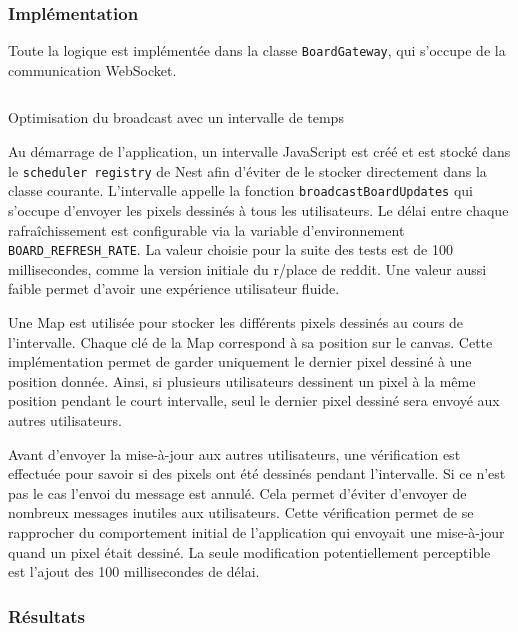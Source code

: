 \subsubsection{Implémentation}

Toute la logique est implémentée dans la classe \texttt{BoardGateway}, qui s'occupe de la communication WebSocket.

\begin{listing}[H]
  \inputminted[highlightlines={3,12,18,19,29},linenos]{ts}{assets/figures/opti-interval.ts}
  \caption{Optimisation du broadcast avec un intervalle de temps}
  \label{listing:opti-interval}
\end{listing}

Au démarrage de l'application, un intervalle JavaScript est créé et est stocké dans le \texttt{scheduler registry} de Nest afin d'éviter de le stocker directement dans la classe courante. L'intervalle appelle la fonction \texttt{broadcastBoardUpdates} qui s'occupe d'envoyer les pixels dessinés à tous les utilisateurs. Le délai entre chaque rafraîchissement est configurable via la variable d'environnement \texttt{BOARD_REFRESH_RATE}. La valeur choisie pour la suite des tests est de 100 millisecondes, comme la version initiale du r/place de \gls{reddit}. Une valeur aussi faible permet d'avoir une expérience utilisateur fluide.

Une Map est utilisée pour stocker les différents pixels dessinés au cours de l'intervalle. Chaque clé de la Map correspond à sa position sur le canvas. Cette implémentation permet de garder uniquement le dernier pixel dessiné à une position donnée. Ainsi, si plusieurs utilisateurs dessinent un pixel à la même position pendant le court intervalle, seul le dernier pixel dessiné sera envoyé aux autres utilisateurs.

Avant d'envoyer la mise-à-jour aux autres utilisateurs, une vérification est effectuée pour savoir si des pixels ont été dessinés pendant l'intervalle. Si ce n'est pas le cas l'envoi du message est annulé. Cela permet d'éviter d'envoyer de nombreux messages inutiles aux utilisateurs. Cette vérification permet de se rapprocher du comportement initial de l'application qui envoyait une mise-à-jour quand un pixel était dessiné. La seule modification potentiellement perceptible est l'ajout des 100 millisecondes de délai.

\subsubsection{Résultats}

